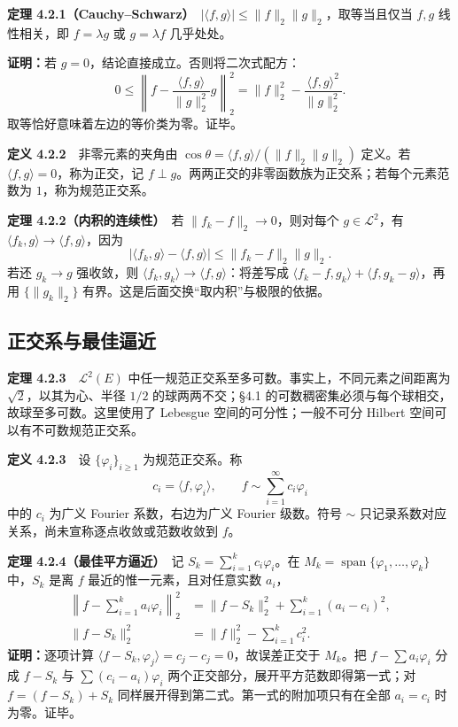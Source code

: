 \documentclass[11pt,a4paper]{article}
\begin{document}
\textbf{定理
4.2.1（Cauchy--Schwarz）}　\(|\langle f,g\rangle|\le\|f\|_2\|g\|_2\)，取等当且仅当
\(f,g\) 线性相关，即 \(f=\lambda g\) 或 \(g=\lambda f\) 几乎处处。

\textbf{证明：}若 \(g=0\)，结论直接成立。否则将二次式配方： \[
0\le\left\|f-\frac{\langle f,g\rangle}{\|g\|_2^2}g\right\|_2^2
=\|f\|_2^2-\frac{\langle f,g\rangle^2}{\|g\|_2^2}.
\] 取等恰好意味着左边的等价类为零。证毕。

\textbf{定义 4.2.2}　非零元素的夹角由
\(\cos\theta=\langle f,g\rangle/(\|f\|_2\|g\|_2)\) 定义。若
\(\langle f,g\rangle=0\)，称为正交，记
\(f\perp g\)。两两正交的非零函数族为正交系；若每个元素范数为
\(1\)，称为规范正交系。

\textbf{定理 4.2.2（内积的连续性）}　若 \(\|f_k-f\|_2\to0\)，则对每个
\(g\in\mathcal L^2\)，有
\(\langle f_k,g\rangle\to\langle f,g\rangle\)，因为 \[
|\langle f_k,g\rangle-\langle f,g\rangle|\le\|f_k-f\|_2\|g\|_2.
\] 若还 \(g_k\to g\) 强收敛，则
\(\langle f_k,g_k\rangle\to\langle f,g\rangle\)：将差写成
\(\langle f_k-f,g_k\rangle+\langle f,g_k-g\rangle\)，再用
\(\{\|g_k\|_2\}\) 有界。这是后面交换``取内积''与极限的依据。

\subsection{正交系与最佳逼近}\label{ch04-s2-ux6b63ux4ea4ux7cfbux4e0eux6700ux4f73ux903cux8fd1}

\textbf{定理 4.2.3}　\(\mathcal L^2(E)\)
中任一规范正交系至多可数。事实上，不同元素之间距离为
\(\sqrt2\)，以其为心、半径 \(1/2\) 的球两两不交；§4.1
的可数稠密集必须与每个球相交，故球至多可数。这里使用了 Lebesgue
空间的可分性；一般不可分 Hilbert 空间可以有不可数规范正交系。

\textbf{定义 4.2.3}　设 \(\{\varphi_i\}_{i\ge1}\) 为规范正交系。称 \[
c_i=\langle f,\varphi_i\rangle,\qquad f\sim\sum_{i=1}^\infty c_i\varphi_i
\] 中的 \(c_i\) 为广义 Fourier 系数，右边为广义 Fourier 级数。符号
\(\sim\) 只记录系数对应关系，尚未宣称逐点收敛或范数收敛到 \(f\)。

\textbf{定理 4.2.4（最佳平方逼近）}　记
\(S_k=\sum_{i=1}^kc_i\varphi_i\)。在
\(M_k=\operatorname{span}\{\varphi_1,\ldots,\varphi_k\}\) 中，\(S_k\)
是离 \(f\) 最近的惟一元素，且对任意实数 \(a_i\)， \[
\begin{aligned}
\left\|f-\sum_{i=1}^ka_i\varphi_i\right\|_2^2
&=\|f-S_k\|_2^2+\sum_{i=1}^k(a_i-c_i)^2,\\
\|f-S_k\|_2^2&=\|f\|_2^2-\sum_{i=1}^kc_i^2.
\end{aligned}
\] \textbf{证明：}逐项计算
\(\langle f-S_k,\varphi_j\rangle=c_j-c_j=0\)，故误差正交于 \(M_k\)。把
\(f-\sum a_i\varphi_i\) 分成 \(f-S_k\) 与 \(\sum(c_i-a_i)\varphi_i\)
两个正交部分，展开平方范数即得第一式；对 \(f=(f-S_k)+S_k\)
同样展开得到第二式。第一式的附加项只有在全部 \(a_i=c_i\) 时为零。证毕。
\end{document}

